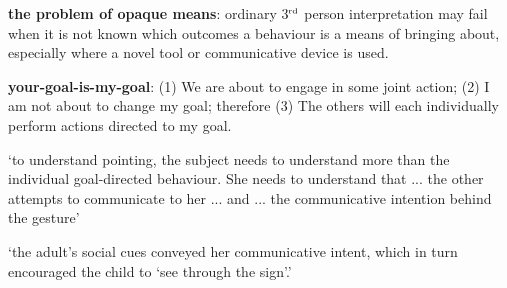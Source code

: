 \documentclass[11pt]{extarticle}
\begin{document}
\begin{multicols}{3}
\textbf{the problem of opaque means}: ordinary 3$^{\textrm{\tiny rd}}$ person interpretation may fail when it is not known which outcomes a behaviour is a means of bringing about, especially where a novel tool or communicative device is used.

\textbf{your-goal-is-my-goal}: (1) We are about to engage in some joint action; (2) I am not about to change my goal; therefore (3) The others will each individually perform actions directed to my goal.


`to understand pointing, the subject needs to understand more than the individual goal-directed behaviour. She needs to understand that ... the other attempts to communicate to her ...  and ... the communicative intention behind the gesture'\citep{Moll:2007gu}

`the adult’s social cues conveyed her communicative intent, which in turn encouraged the child to `see through the sign'.'
\citep%
{leekam_adults_2010}




\footnotesize 


\end{multicols}
\end{document}
